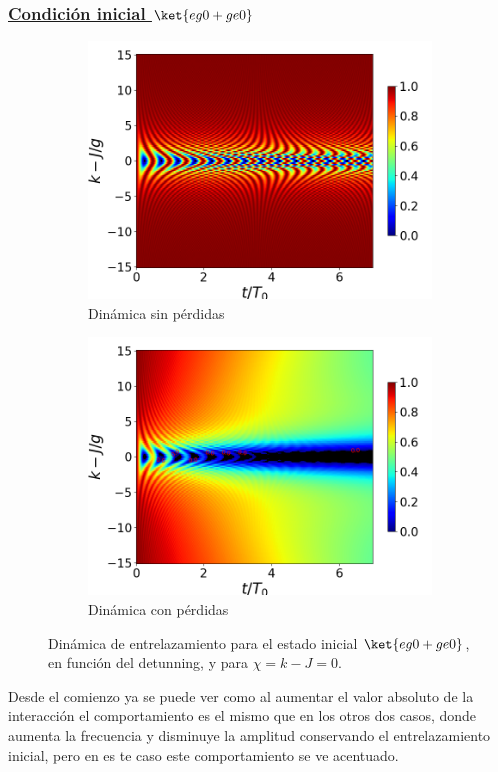 \subsubsection{\underline{Condición inicial $\ket{eg0+ge0}$}}
\begin{figure}[h!]
    \centering
    \begin{subfigure}{0.49\textwidth}
        \includegraphics[width=\textwidth]{figuras/ch4/concu/k/eg0+ge0 d=0.0g x=0.0g J=15.0g gamma=0.25g concu k uni.png}
        \caption{Dinámica sin pérdidas}
        \label{fig4:concu k 0 uni}
    \end{subfigure}
    \hfill
    \begin{subfigure}{0.49\textwidth}
        \includegraphics[width=\textwidth]{figuras/ch4/concu/k/eg0+ge0 d=0.0g x=0.0g J=15.0g gamma=0.25g concu k dis.png}
        \caption{Dinámica con pérdidas}
        \label{fig4:concu k 0 dis}
    \end{subfigure}
    \caption{Dinámica de entrelazamiento para el estado inicial $\ket{eg0+ge0}$, en función del detunning, y para $\chi=k-J=0$.}
    \label{fig4:concu k 0}
\end{figure}
Desde el comienzo ya se puede ver como al aumentar el valor absoluto de la interacción el comportamiento es el mismo que en los otros dos casos, donde aumenta la frecuencia y disminuye la amplitud conservando el entrelazamiento inicial, pero en es te caso este comportamiento se ve acentuado. 


